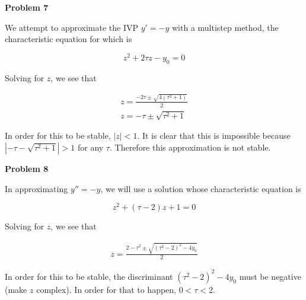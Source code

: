 \documentclass[a4paper,12pt]{article}
\begin{document}
{\bf Problem 7}
\smallskip

We attempt to approximate the IVP $y'=-y$ with a multistep method, the characteristic equation for which is 

\begin{equation*}
z^2+2\tau z-y_0=0
\end{equation*}

Solving for $z$, we see that 

\begin{eqnarray*}
z=\frac{-2\tau \pm \sqrt{4(\tau^2+1)}}{2} \\
z=-\tau \pm \sqrt{\tau^2+1}
\end{eqnarray*}

In order for this to be stable, $|z|<1$. It is clear that this is impossible because $|-\tau-\sqrt{\tau^2+1}|>1$ for any $\tau$. Therefore this approximation is not stable. 
\bigskip

{\bf Problem 8}

In approximating $y''=-y$, we will use a solution whose characteristic equation is 

\begin{equation*}
z^2+(\tau-2)z+1=0
\end{equation*}

Solving for $z$, we see that 

\begin{eqnarray*}
z=\frac{2-\tau^2 \pm \sqrt{(\tau^2-2)^2-4y_0}}{2}
\end{eqnarray*}

In order for this to be stable, the discriminant $(\tau^2-2)^2-4y_0$ must be negative (make $z$ complex). In order for that to happen, $0 < \tau < 2$. 
\end{document}

